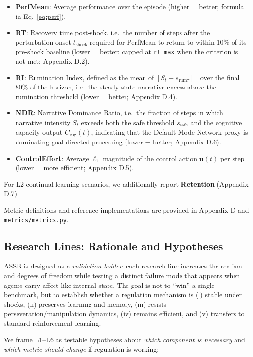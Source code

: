 \documentclass{article}
\begin{document}
\begin{itemize}
    \item \textbf{PerfMean}: Average performance over the episode (higher = better; formula in Eq.~\ref{eq:perf}).
    \item \textbf{RT}: Recovery time post-shock, i.e.\ the number of steps after the perturbation onset $t_{\text{shock}}$ required for PerfMean to return to within 10\% of its pre-shock baseline (lower = better; capped at \texttt{rt\_max} when the criterion is not met; Appendix D.2).
    \item \textbf{RI}: Rumination Index, defined as the mean of $[S_t - s_{\text{rum}\tau}]^{+}$ over the final 80\% of the horizon, i.e.\ the steady-state narrative excess above the rumination threshold (lower = better; Appendix D.4).
    \item \textbf{NDR}: Narrative Dominance Ratio, i.e.\ the fraction of steps in which narrative intensity $S_t$ exceeds both the safe threshold $s_{\text{safe}}$ and the cognitive capacity output $C_{\text{cog}}(t)$, indicating that the Default Mode Network proxy is dominating goal-directed processing (lower = better; Appendix D.6).
    \item \textbf{ControlEffort}: Average $\ell_1$ magnitude of the control action $\mathbf{u}(t)$ per step (lower = more efficient; Appendix D.5).
\end{itemize}

For L2 continual-learning scenarios, we additionally report \textbf{Retention} (Appendix D.7).

Metric definitions and reference implementations are provided in Appendix D and \texttt{metrics/metrics.py}.

\subsection{Research Lines: Rationale and Hypotheses}

ASSB is designed as a \textit{validation ladder}: each research line increases the realism and degrees of freedom while testing a distinct failure mode that appears when agents carry affect-like internal state. The goal is not to ``win'' a single benchmark, but to establish whether a regulation mechanism is (i) stable under shocks, (ii) preserves learning and memory, (iii) resists perseveration/manipulation dynamics, (iv) remains efficient, and (v) transfers to standard reinforcement learning.

We frame L1--L6 as testable hypotheses about \textit{which component is necessary} and \textit{which metric should change} if regulation is working:
\end{document}
